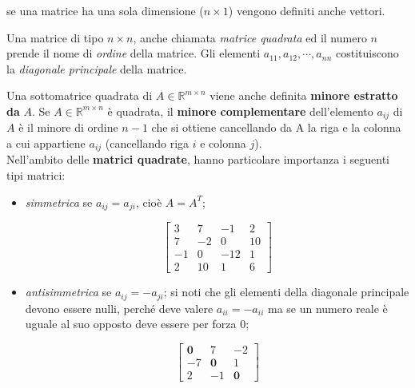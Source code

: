 \begin{oss}
  \label{oss:matrice1}
  se una matrice ha una sola dimensione ($n\times 1$) vengono definiti
  anche vettori.
\end{oss}
\begin{defi}
  \label{defi:matrice4}
  Una matrice di tipo $n\times n$, anche chiamata \textit{matrice
    quadrata} ed il numero $n$ prende il nome di \textit{ordine} della
  matrice. Gli elementi $a_{11},a_{12},\cdots,a_{nn}$ costituiscono la
  \textit{diagonale principale} della matrice.

  Una sottomatrice quadrata di $A\in\mathds{R}^{m\times n}$ viene anche
  definita \textbf{minore estratto da} $A$. Se $A\in\mathds{R}^{m\times n}$
  è quadrata, il \textbf{minore complementare} dell'elemento $a_{ij}$ di
  $A$ è il minore di ordine $n-1$ che si ottiene cancellando da A la
  riga e la colonna a cui appartiene $a_{ij}$ (cancellando riga $i$ e
  colonna $j$).\\
  Nell'ambito delle \textbf{matrici quadrate}, hanno particolare
  importanza i seguenti tipi matrici:
  \begin{itemize}
  \item \textit{simmetrica} se $a_{ij}=a_{ji}$, cioè $A=A^T$;
    \begin{es}
      \label{es:matrice4-1}
      \begin{equation*}
        \begin{bmatrix}
          3 & 7 & -1 & 2\\
          7 & -2 & 0 & 10\\
          -1 & 0 & -12 & 1\\
          2 & 10 & 1 & 6 
        \end{bmatrix}
      \end{equation*}
    \end{es}
  \item \textit{antisimmetrica} se $a_{ij}=-a_{ji}$; si noti che gli
    elementi della diagonale principale devono essere nulli, perché deve
    valere $a_{ii}=-a_{ii}$ ma se un numero reale è uguale al suo opposto
    deve essere per forza 0;
    \begin{es}
      \label{es:matrice4-2}
      \begin{equation*}
        \begin{bmatrix}
          \mathbf{0} & 7 & -2\\
          -7 & \mathbf{0} & 1\\
          2 & -1 & \mathbf{0}
        \end{bmatrix}

\end{equation*}
\end{es}
\end{itemize}
\end{defi}
